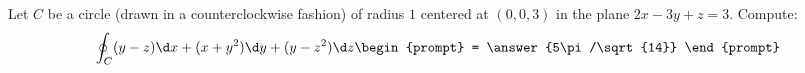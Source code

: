 \documentclass{ximera}
\author{Bart Snapp}
\begin{document}
\begin{exercise}
  Let $C$ be a circle (drawn in a counterclockwise fashion) of radius
  $1$ centered at $(0,0,3)$ in the plane $2x-3y+z = 3$.  Compute:
  \[
  \oint_C (y-z) \d x + (x+y^2)\d y + (y-z^2) \d z
  \begin{prompt}
    = \answer{5\pi/\sqrt{14}}
  \end{prompt}
  \]
\end{exercise}
\end{document}
